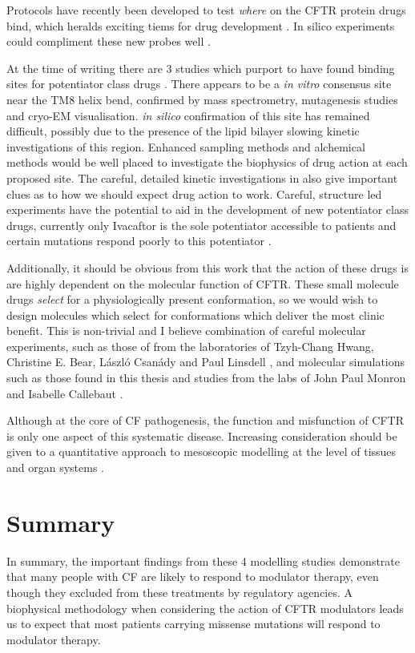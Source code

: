 Protocols have recently been developed to test \textit{where} on the CFTR protein drugs bind, which heralds exciting tiems for drug development \cite{laselva2022}. In silico experiments could compliment these new probes well \cite{}.

At the time of writing there are 3 studies which purport to have found binding sites for potentiator class drugs \cite{}. There appears to be a \textit {in vitro} consensus site near the TM8 helix bend, confirmed by mass spectrometry, mutagenesis studies and cryo-EM visualisation. \textit{in silico} confirmation of this site has remained difficult, possibly due to the presence of the lipid bilayer slowing kinetic investigations of this region. Enhanced sampling methods and alchemical methods would be well placed to investigate the biophysics of drug action at each proposed site. The careful, detailed kinetic investigations in \cite{csanady2019} also give important clues as to how we should expect drug action to work. Careful, structure led experiments have the potential to aid in the development of new potentiator class drugs, currently only Ivacaftor is the sole potentiator accessible to patients and certain mutations respond poorly to this potentiator \cite{phuan2018, vangoor2014}. 

Additionally, it should be obvious from this work that the action of these drugs is are highly dependent on the molecular function of CFTR. These small molecule drugs \textit{select} for a physiologically present conformation, so we would wish to design molecules which select for conformations which deliver the most clinic benefit. This is non-trivial and I believe  combination of careful molecular experiments, such as those of from the laboratories of Tzyh-Chang Hwang,  Christine E. Bear, L\'aszl\'o Csan\'ady and Paul Linsdell \cite{linsdell2018, csanady2019, zhang2017b}, and molecular simulations such as those found in this thesis and studies from the labs of John Paul Monron and Isabelle Callebaut \cite{Hoffmann2018}.

Although at the core of CF pathogenesis, the function and misfunction of CFTR is only one aspect of this systematic disease. Increasing consideration should be given to a quantitative approach to mesoscopic modelling at the level of tissues and organ systems \cite{volt2014}.

\section{Summary}
In summary, the important findings from these 4 modelling studies demonstrate that many people with CF are likely to respond to modulator therapy, even though they excluded from these treatments by regulatory agencies. A biophysical methodology when considering the action of CFTR modulators leads us to expect that most patients carrying missense mutations will respond to modulator therapy.

